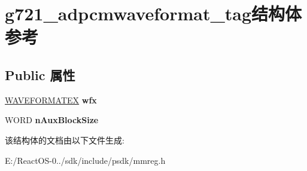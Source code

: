 \hypertarget{structg721__adpcmwaveformat__tag}{}\section{g721\+\_\+adpcmwaveformat\+\_\+tag结构体 参考}
\label{structg721__adpcmwaveformat__tag}
\subsection*{Public 属性}
\begin{DoxyCompactItemize}
\item 
\mbox{\label{structg721__adpcmwaveformat__tag_a4b76075dc49a2da4865900e7a761bc00}} 
\hyperlink{struct_w_a_v_e_f_o_r_m_a_t_e_x}{W\+A\+V\+E\+F\+O\+R\+M\+A\+T\+EX} {\bfseries wfx}
\item 
\mbox{\label{structg721__adpcmwaveformat__tag_a06f29525b6f90d4fb71f176806117c95}} 
W\+O\+RD {\bfseries n\+Aux\+Block\+Size}
\end{DoxyCompactItemize}


该结构体的文档由以下文件生成\+:\begin{DoxyCompactItemize}
\item 
E\+:/\+React\+O\+S-\/0../sdk/include/psdk/mmreg.\+h\end{DoxyCompactItemize}
